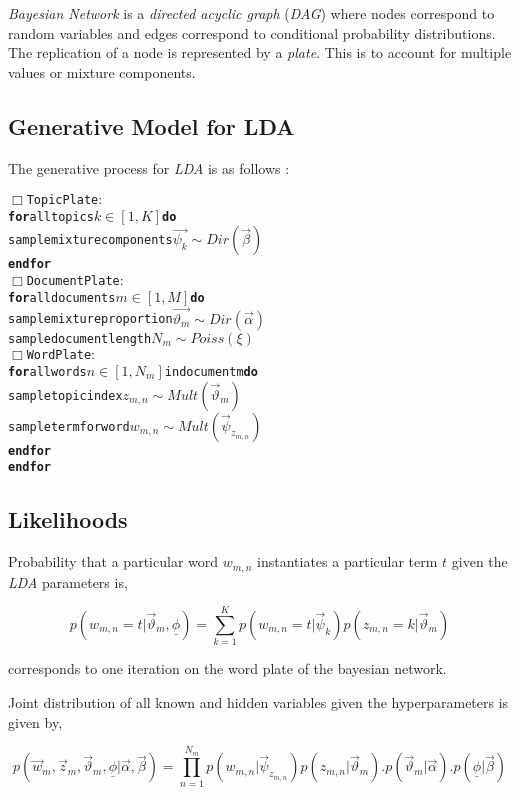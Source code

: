 \textit{Bayesian Network} is a \textit{directed acyclic graph} (\textit{DAG}) where nodes correspond to random variables and edges correspond
to conditional probability distributions. The replication of a node is represented by a \textit{plate}. This is to account for multiple
values or mixture components.

\subsection{Generative Model for LDA}

The generative process for \textit{LDA} is as follows \(\colon\)

\begin{alltt}
\(\Box\) Topic Plate \(\colon\)
\textbf{for} all topics \( k \in [1,K] \) \textbf{do}
  sample mixture components \( \vec{\psi_k} \sim Dir(\vec{\beta}) \)
\textbf{end for}
\(\Box\) Document Plate \(\colon\)
\textbf{for} all documents \( m \in [1,M] \) \textbf{do}
  sample mixture proportion \( \vec{\vartheta_m} \sim Dir(\vec{\alpha}) \)
  sample document length \( N_m \sim Poiss(\xi)\)
  \(\Box\) Word Plate \(\colon\)
  \textbf{for} all words \( n \in [1,N_m] \) in document m \textbf{do}
    sample topic index \( z_{m,n} \sim Mult(\vec{\vartheta}_m) \)
    sample term for word \( w_{m,n} \sim Mult(\vec{\psi}_{z_{m,n}}) \)
  \textbf{end for}
\textbf{end for}
\end{alltt}

\subsection{Likelihoods}

Probability that a particular word \(w_{m,n}\) instantiates a particular term \(t\) given the \textit{LDA} parameters is,

\begin{equation}\label{eqn:likelihood}
 p(w_{m,n}=t|\vec{\vartheta}_m,\underline{\phi}) = \sum_{k=1}^{K} p(w_{m,n}=t|\vec{\psi}_k)p(z_{m,n}=k|\vec{\vartheta}_m)
\end{equation}

 corresponds to one iteration on the word plate of the bayesian network.

Joint distribution of all known and hidden variables given the hyperparameters is given by,

\begin{equation}
p(\vec{w}_m,\vec{z}_m,\vec{\vartheta}_m,\underline{\phi}|\vec{\alpha},\vec{\beta}) = 
\prod_{n=1}^{N_m} p(w_{m,n}|\vec{\psi}_{z_{m,n}})p(z_{m,n}|\vec{\vartheta}_m).p(\vec{\vartheta}_m|\vec{\alpha}).p(\underline{\phi}|\vec{\beta})
\end{equation}


